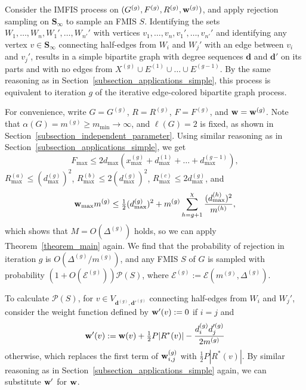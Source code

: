 \documentclass{article}
\theoremstyle{plain}
\theoremstyle{remark}
\theoremstyle{plain}
\numberwithin{equation}{section}
\renewcommand{\d}{{\boldsymbol{d}}}
\renewcommand{\b}{{\bf{w}}}
\begin{document}
	Consider the IMFIS process on $(G^{(g)},F^{(g)},R^{(g)},\b^{(g)})$, and apply rejection sampling on $\boldsymbol{S}_{\infty}$ to sample an FMIS $S$. Identifying the sets $W_1,\ldots,W_n,W_1',\ldots,W_{n'}'$ with vertices $v_1,\ldots,v_n,v_1',\ldots,v_{n'}'$ and identifying any vertex $v\in\boldsymbol{S}_{\infty}$ connecting half-edges from $W_i$ and $W_j'$ with an edge between $v_i$ and $v_j'$, results in a simple bipartite graph with degree sequences $\d$ and $\d'$ on its parts and with no edges from $X^{(g)}\cup E^{(1)}\cup\ldots\cup E^{(g-1)}$. By the same reasoning as in Section~\ref{subsection_applications_simple}, this process is equivalent to iteration $g$ of the iterative edge-colored bipartite graph process.
	
	For convenience, write $G=G^{(g)}$, $R=R^{(g)}$, $F=F^{(g)}$, and $\b=\b^{(g)}$. Note that $\alpha(G)=m^{(g)}\geq m_{\min}\to\infty$, and $\ell(G)=2$ is fixed, as shown in Section~\ref{subsection_independent_parameter}. Using similar reasoning as in Section~\ref{subsection_applications_simple}, we get $$F_{\max}\leq2d_{\max}(x_{\max}^{(g)}+d_{\max}^{(1)}+\ldots+d_{\max}^{(g-1)}),$$ $R_{\max}^{(a)}\leq(d_{\max}^{(g)})^2$, $R_{\max}^{(b)}\leq2(d_{\max}^{(g)})^2$, $R_{\max}^{(c)}\leq2d_{\max}^{(g)}$, and $$\b_{\max}m^{(g)}\leq\tfrac12(d_{\max}^{(g)})^2+m^{(g)}\sum_{h=g+1}^{\chi}\frac{(d_{\max}^{(h)})^2}{m^{(h)}},$$ which shows that $M=O(\Delta^{(g)})$ holds, so we can apply Theorem~\ref{theorem_main} again. We find that the probability of rejection in iteration $g$ is $O(\Delta^{(g)}/m^{(g)})$, and any FMIS $S$ of $G$ is sampled with probability $(1+O(\mathscr{E}^{(g)}))\mathscr{P}(S)$, where $\mathscr{E}^{(g)}:=\mathscr{E}(m^{(g)},\Delta^{(g)})$.
	
	To calculate $\mathscr{P}(S)$, for $v\in V_{\d^{(g)},\d'^{(g)}}$ connecting half-edges from $W_i$ and $W_j'$, consider the weight function defined by $\b'(v):=0$ if $i=j$ and $$\b'(v):=\b(v)+\tfrac12P|R^*(v)|-\frac{d_i^{(g)}d_j'^{(g)}}{2m^{(g)}}$$ otherwise, which replaces the first term of $\b_{i,j}^{(g)}$ with $\frac12P|R^*(v)|$. By similar reasoning as in Section~\ref{subsection_applications_simple} again, we can substitute $\b'$ for $\b$.
	
\end{document}
